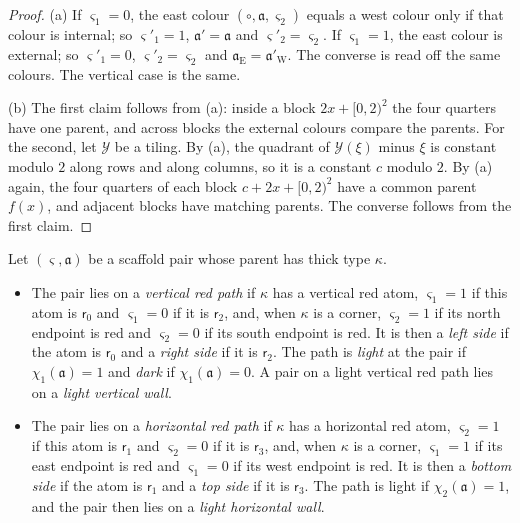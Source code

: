 \begin{proof}
(a) If $\varsigma_1=0$, the east colour $(\circ,\mathfrak a,\varsigma_2)$ equals a west colour only if that colour is internal; so $\varsigma'_1=1$, $\mathfrak a'=\mathfrak a$ and $\varsigma'_2=\varsigma_2$. If $\varsigma_1=1$, the east colour is external; so $\varsigma'_1=0$, $\varsigma'_2=\varsigma_2$ and $\mathfrak a_{\mathrm E}=\mathfrak a'_{\mathrm W}$. The converse is read off the same colours. The vertical case is the same.

(b) The first claim follows from (a): inside a block $2x+[0,2)^2$ the four quarters have one parent, and across blocks the external colours compare the parents. For the second, let $\mathcal Y$ be a tiling. By (a), the quadrant of $\mathcal Y(\xi)$ minus $\xi$ is constant modulo $2$ along rows and along columns, so it is a constant $c$ modulo $2$. By (a) again, the four quarters of each block $c+2x+[0,2)^2$ have a common parent $f(x)$, and adjacent blocks have matching parents. The converse follows from the first claim.
\end{proof}

\begin{definition}[Walls]\label{fam:def-walls}
Let $(\varsigma,\mathfrak a)$ be a scaffold pair whose parent has thick type $\kappa$.
\begin{itemize}
\item The pair lies on a \emph{vertical red path} if $\kappa$ has a vertical red atom, $\varsigma_1=1$ if this atom is $\mathsf r_0$ and $\varsigma_1=0$ if it is $\mathsf r_2$, and, when $\kappa$ is a corner, $\varsigma_2=1$ if its north endpoint is red and $\varsigma_2=0$ if its south endpoint is red. It is then a \emph{left side} if the atom is $\mathsf r_0$ and a \emph{right side} if it is $\mathsf r_2$. The path is \emph{light} at the pair if $\chi_1(\mathfrak a)=1$ and \emph{dark} if $\chi_1(\mathfrak a)=0$. A pair on a light vertical red path lies on a \emph{light vertical wall}.
\item The pair lies on a \emph{horizontal red path} if $\kappa$ has a horizontal red atom, $\varsigma_2=1$ if this atom is $\mathsf r_1$ and $\varsigma_2=0$ if it is $\mathsf r_3$, and, when $\kappa$ is a corner, $\varsigma_1=1$ if its east endpoint is red and $\varsigma_1=0$ if its west endpoint is red. It is then a \emph{bottom side} if the atom is $\mathsf r_1$ and a \emph{top side} if it is $\mathsf r_3$. The path is light if $\chi_2(\mathfrak a)=1$, and the pair then lies on a \emph{light horizontal wall}.
\end{itemize}
\end{definition}

